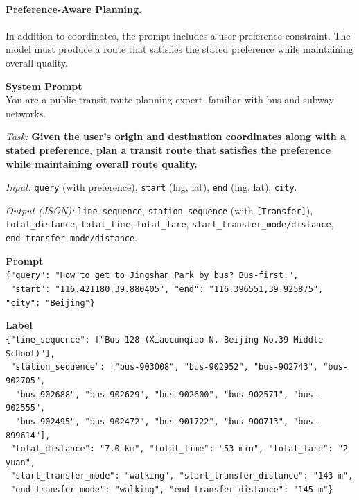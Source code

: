 \documentclass{llmxive}
\begin{document}
\paragraph{Preference-Aware Planning.}
In addition to coordinates, the prompt includes a user preference constraint. The model must produce a route that satisfies the stated preference while maintaining overall quality.
\begin{tcolorbox}[colback=gray!3, colframe=black!40, boxrule=0.4pt, arc=2pt, left=6pt, right=6pt, top=4pt, bottom=4pt, fontupper=\small, fontlower=\small, breakable, title={\small\textbf{Prompt \& Label}}]
\textbf{System Prompt} \\[2pt]
You are a public transit route planning expert, familiar with bus and subway networks.

\textit{Task:} \textbf{Given the user's origin and destination coordinates along with a stated preference, plan a transit route that satisfies the preference while maintaining overall route quality.}

\textit{Input:} \texttt{query} (with preference), \texttt{start} (lng, lat), \texttt{end} (lng, lat), \texttt{city}.

\textit{Output (JSON):} \texttt{line\_sequence}, \texttt{station\_sequence} (with \texttt{[Transfer]}), \texttt{total\_distance}, \texttt{total\_time}, \texttt{total\_fare}, \texttt{start\_transfer\_mode/distance}, \texttt{end\_transfer\_mode/distance}.

\tcblower

\textbf{Prompt} \\[2pt]
\texttt{\{"query": "How to get to Jingshan Park by bus? Bus-first.",} \\
\texttt{~"start": "116.421180,39.880405", "end": "116.396551,39.925875", "city": "Beijing"\}}

\vspace{6pt}
\textbf{Label} \\[2pt]
\texttt{\{"line\_sequence": ["Bus 128 (Xiaocunqiao N.--Beijing No.39 Middle School)"],} \\
\texttt{~"station\_sequence": ["bus-903008", "bus-902952", "bus-902743", "bus-902705",} \\
\texttt{~~"bus-902688", "bus-902629", "bus-902600", "bus-902571", "bus-902555",} \\
\texttt{~~"bus-902495", "bus-902472", "bus-901722", "bus-900713", "bus-899614"],} \\
\texttt{~"total\_distance": "7.0 km", "total\_time": "53 min", "total\_fare": "2 yuan",} \\
\texttt{~"start\_transfer\_mode": "walking", "start\_transfer\_distance": "143 m",} \\
\texttt{~"end\_transfer\_mode": "walking", "end\_transfer\_distance": "145 m"\}}
\end{tcolorbox}
\end{document}
